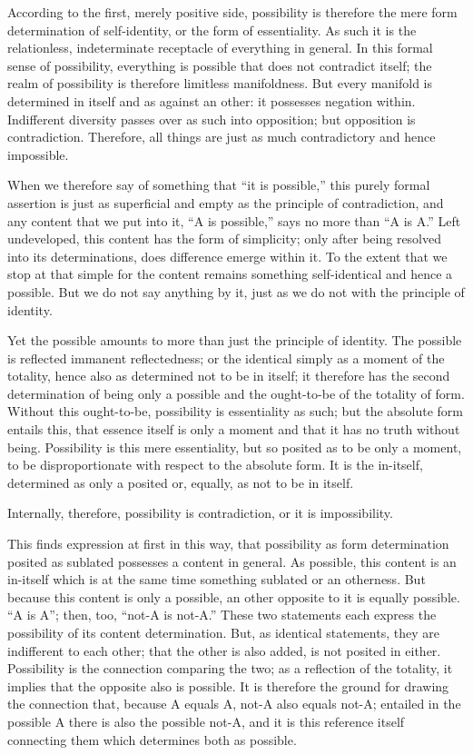 According to the first, merely positive side,
possibility is therefore the mere
form determination of self-identity,
or the form of essentiality.
As such it is the relationless, indeterminate
receptacle of everything in general.
In this formal sense of possibility,
everything is possible that does not contradict itself;
the realm of possibility is therefore limitless manifoldness.
But every manifold is determined in itself and as against an other:
it possesses negation within.
Indifferent diversity passes over as such into opposition;
but opposition is contradiction.
Therefore, all things are just as much contradictory
and hence impossible.

When we therefore say of something that “it is possible,”
this purely formal assertion is just as superficial and empty
as the principle of contradiction,
and any content that we put into it,
“A is possible,” says no more than “A is A.”
Left undeveloped, this content has the form of simplicity;
only after being resolved into its determinations,
does difference emerge within it.
To the extent that we stop at that simple for
the content remains something self-identical
and hence a possible.
But we do not say anything by it,
just as we do not with the principle of identity.

Yet the possible amounts to more than just the principle of identity.
The possible is reflected immanent reflectedness;
or the identical simply as a moment of the totality,
hence also as determined not to be in itself;
it therefore has the second determination of being only a possible
and the ought-to-be of the totality of form.
Without this ought-to-be, possibility is essentiality as such;
but the absolute form entails this,
that essence itself is only a moment
and that it has no truth without being.
Possibility is this mere essentiality,
but so posited as to be only a moment,
to be disproportionate with respect to the absolute form.
It is the in-itself, determined as only a posited
or, equally, as not to be in itself.

Internally, therefore, possibility is contradiction,
or it is impossibility.

This finds expression at first in this way,
that possibility as form determination posited as sublated
possesses a content in general.
As possible, this content is an in-itself
which is at the same time something sublated
or an otherness.
But because this content is only a possible,
an other opposite to it is equally possible.
“A is A”; then, too, “not-A is not-A.”
These two statements each express
the possibility of its content determination.
But, as identical statements, they are indifferent to each other;
that the other is also added, is not posited in either.
Possibility is the connection comparing the two;
as a reflection of the totality,
it implies that the opposite also is possible.
It is therefore the ground for drawing the connection that,
because A equals A, not-A also equals not-A;
entailed in the possible A there is also the possible not-A,
and it is this reference itself connecting them
which determines both as possible.

